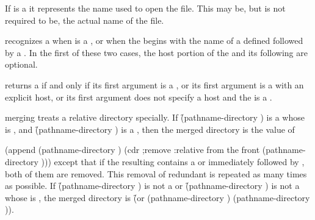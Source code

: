 If  is a 
it represents the name used to open the file. This may be, but is
not required to be, the actual name of the file. 

 recognizes a  
   when  is a ,
or when the  begins with 
    the name of a defined  followed by a .
In the first of these two cases,
the host portion of the  
and its following  are optional.

 returns a 
 if and only if
   its first argument is a ,
or its first argument is a   with an explicit host,
or its first argument does not specify a host 
    and the  is a .
 
 merging treats a relative directory specially.  
If \f{(pathname-directory )} is a  whose
 is , and 
\f{(pathname-directory )} is a , then
the merged directory is the value of

\code
 (append (pathname-directory )
         (cdr  ;remove :relative from the front
           (pathname-directory )))
\endcode
except that if the resulting  contains a  or 
immediately followed by , both of them are removed.  This removal of 
redundant   is repeated as many times as possible.
If \f{(pathname-directory )} is not a  or
\f{(pathname-directory )} is not a  
whose  is , the merged directory is
\f{(or (pathname-directory ) (pathname-directory ))}.

